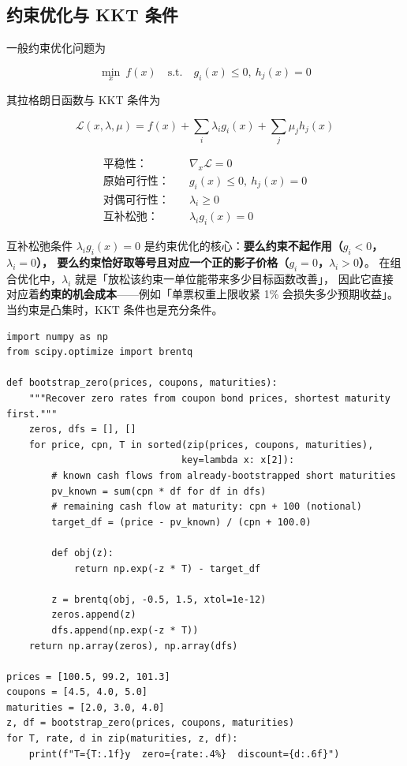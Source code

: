 \subsection{约束优化与 KKT 条件}

一般约束优化问题为

\begin{equation}
  \min_{x}\ f(x) \quad \text{s.t.}\quad g_i(x)\le 0,\ h_j(x)=0
  \label{eq:05-constrained}
\end{equation}

其拉格朗日函数与 KKT 条件为

\begin{equation}
  \mathcal{L}(x,\lambda,\mu) = f(x) + \sum_i\lambda_i g_i(x) + \sum_j\mu_j h_j(x)
  \label{eq:05-lagrange}
\end{equation}

\begin{align}
  \text{平稳性：} & \quad \nabla_x\mathcal{L} = 0 \label{eq:05-kkt1}\\
  \text{原始可行性：} & \quad g_i(x)\le 0,\ h_j(x) = 0 \label{eq:05-kkt2}\\
  \text{对偶可行性：} & \quad \lambda_i \ge 0 \label{eq:05-kkt3}\\
  \text{互补松弛：} & \quad \lambda_i g_i(x) = 0 \label{eq:05-kkt4}
\end{align}

\begin{keybox}
互补松弛条件 $\lambda_i g_i(x)=0$ 是约束优化的核心：\textbf{要么约束不起作用（$g_i<0$，$\lambda_i=0$），
要么约束恰好取等号且对应一个正的影子价格（$g_i=0$，$\lambda_i>0$）}。
在组合优化中，$\lambda_i$ 就是「放松该约束一单位能带来多少目标函数改善」，
因此它直接对应着\textbf{约束的机会成本}——例如「单票权重上限收紧 1\% 会损失多少预期收益」。
当约束是凸集时，KKT 条件也是充分条件。
\end{keybox}

\begin{lstlisting}[style=pythonstyle, caption={用牛顿法反解零息利率曲线（bootstrap 的数值版本）}, label={lst:05-boot}]
import numpy as np
from scipy.optimize import brentq

def bootstrap_zero(prices, coupons, maturities):
    """Recover zero rates from coupon bond prices, shortest maturity first."""
    zeros, dfs = [], []
    for price, cpn, T in sorted(zip(prices, coupons, maturities),
                               key=lambda x: x[2]):
        # known cash flows from already-bootstrapped short maturities
        pv_known = sum(cpn * df for df in dfs)
        # remaining cash flow at maturity: cpn + 100 (notional)
        target_df = (price - pv_known) / (cpn + 100.0)

        def obj(z):
            return np.exp(-z * T) - target_df

        z = brentq(obj, -0.5, 1.5, xtol=1e-12)
        zeros.append(z)
        dfs.append(np.exp(-z * T))
    return np.array(zeros), np.array(dfs)

prices = [100.5, 99.2, 101.3]
coupons = [4.5, 4.0, 5.0]
maturities = [2.0, 3.0, 4.0]
z, df = bootstrap_zero(prices, coupons, maturities)
for T, rate, d in zip(maturities, z, df):
    print(f"T={T:.1f}y  zero={rate:.4%}  discount={d:.6f}")
\end{lstlisting}

